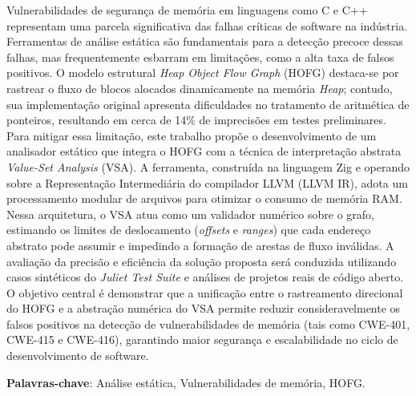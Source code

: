 \documentclass[
    12pt,                %
    openright,           %
    oneside,             %
    a4paper,             %
    english,             %
    brazil               %
]{abntex2}
\begin{document}

\frenchspacing

\pretextual

\imprimircapa

\imprimirfolhaderosto

\begin{resumo}

\vspace{\onelineskip}

Vulnerabilidades de segurança de memória em linguagens como C e C++ representam uma parcela significativa das falhas críticas de software na indústria. 
Ferramentas de análise estática são fundamentais para a detecção precoce dessas falhas, mas frequentemente esbarram em limitações, como a alta taxa de falsos positivos. 
O modelo estrutural \textit{Heap Object Flow Graph} (HOFG) destaca-se por rastrear o fluxo de blocos alocados dinamicamente na memória \textit{Heap}; contudo, sua implementação original apresenta dificuldades no tratamento de aritmética de ponteiros, 
resultando em cerca de 14\% de imprecisões em testes preliminares. Para mitigar essa limitação, este trabalho propõe o desenvolvimento de um analisador estático que integra o HOFG com a técnica de interpretação abstrata \textit{Value-Set Analysis} (VSA). 
A ferramenta, construída na linguagem Zig e operando sobre a Representação Intermediária do compilador LLVM (LLVM IR), adota um processamento modular de arquivos para otimizar o consumo de memória RAM. Nessa arquitetura, o VSA atua como um validador numérico sobre o grafo, estimando os limites de deslocamento (\textit{offsets} e \textit{ranges}) 
que cada endereço abstrato pode assumir e impedindo a formação de arestas de fluxo inválidas. A avaliação da precisão e eficiência da solução proposta será conduzida utilizando casos sintéticos do \textit{Juliet Test Suite} e análises de projetos reais de código aberto. O objetivo central é demonstrar que a unificação entre o rastreamento direcional do HOFG e a 
abstração numérica do VSA permite reduzir consideravelmente os falsos positivos na detecção de vulnerabilidades de memória (tais como CWE-401, CWE-415 e CWE-416), garantindo maior segurança e escalabilidade no ciclo de desenvolvimento de software.


\noindent
\textbf{Palavras-chave}: Análise estática, Vulnerabilidades de memória, HOFG.
\end{resumo}
\end{document}
